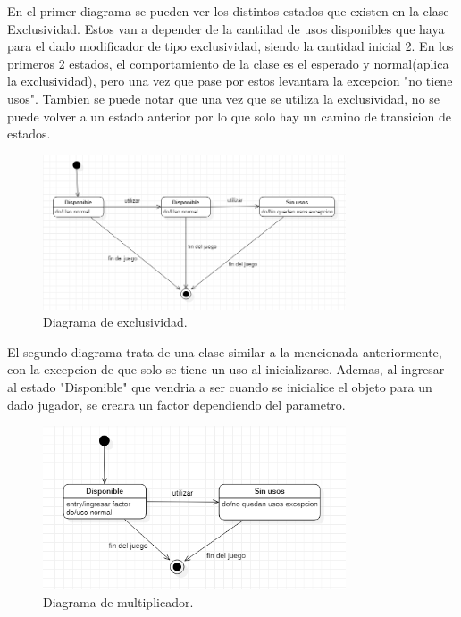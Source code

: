 \documentclass[titlepage,a4paper]{article}
\begin{document}
En el primer diagrama se pueden ver los distintos estados que existen en la clase Exclusividad. Estos van a depender de la cantidad de usos disponibles que haya para el dado modificador de tipo exclusividad, siendo la cantidad inicial 2. En los primeros 2 estados, el comportamiento de la clase es el esperado y normal(aplica la exclusividad), pero una vez que pase por estos levantara la  excepcion "no tiene usos".
Tambien se puede notar que una vez que se utiliza la exclusividad, no se puede volver a un estado anterior por lo que solo hay un camino de transicion de estados.

\begin{figure}[H]
    \centering
    \includegraphics[width=0.8\textwidth]{DiagramaDeEstadoExclusividad.png}
    \caption{\label{fig:class03}Diagrama de exclusividad.}
\end{figure}

El segundo diagrama trata de una clase similar a la mencionada anteriormente, con la excepcion de que solo se tiene un uso al inicializarse. Ademas, al ingresar al estado "Disponible" que vendria a ser cuando se inicialice el objeto para un dado jugador, se creara un factor dependiendo del parametro.

\begin{figure}[H]
    \centering
    \includegraphics[width=0.8\textwidth]{DiagramaDeEstadoMultiplicador.png}
    \caption{\label{fig:class04}Diagrama de multiplicador.}
\end{figure}
\end{document}
